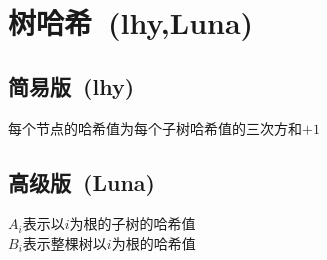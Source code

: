 \section{树哈希~\small(lhy,Luna)}
    \subsection*{简易版~\small(lhy)}
        每个节点的哈希值为每个子树哈希值的三次方和$ + 1 $
    \subsection*{高级版~\small(Luna)}
        \noindent $A_i$表示以$i$为根的子树的哈希值\\
        $B_i$表示整棵树以$i$为根的哈希值

